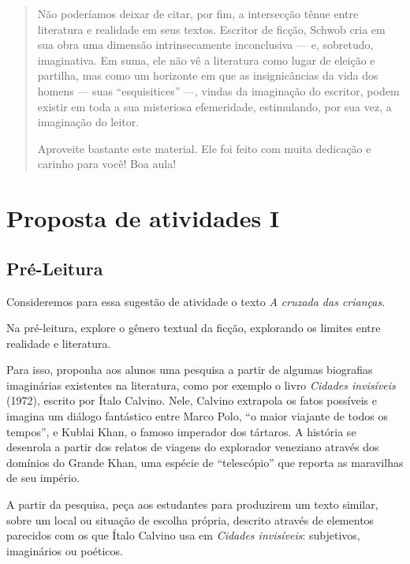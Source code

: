 \documentclass[12pt]{extarticle}
\begin{document}
\begin{abstract}
Não poderíamos deixar de citar, por fim, a intersecção tênue entre literatura 
e realidade em seus textos. Escritor de ficção, Schwob cria em sua obra uma 
dimensão intrinsecamente inconclusiva — e, sobretudo, imaginativa. Em suma, 
ele não vê a literatura como lugar de eleição e partilha, mas como um horizonte 
em que as insignicâncias da vida dos homens — suas ``esquisitices'' —, vindas 
da imaginação do escritor, podem existir em toda a sua misteriosa efemeridade, 
estimulando, por sua vez, a imaginação do leitor.

Aproveite bastante este material. Ele foi feito com muita dedicação e
carinho para você! Boa aula!


\end{abstract}


\tableofcontents



\section{Proposta de atividades I}

\subsection{Pré-Leitura}

Consideremos para essa sugestão de atividade o texto \textit{A cruzada das crianças}. 

Na pré-leitura, explore o gênero textual da ficção, explorando
os limites entre realidade e literatura.
 
Para isso, proponha aos alunos uma pesquisa a partir de algumas biografias
imaginárias existentes na literatura, como por exemplo o livro \emph{Cidades invisíveis} 
(1972), escrito por Ítalo Calvino. Nele, Calvino extrapola os fatos possíveis 
e imagina um diálogo fantástico entre Marco Polo, ``o maior viajante de todos os tempos'', 
e Kublai Khan, o famoso imperador dos tártaros. A história se desenrola a partir 
dos relatos de viagens do explorador veneziano através dos domínios do 
Grande Khan, uma espécie de ``telescópio'' que reporta as maravilhas de seu império.



A partir da pesquisa, peça aos estudantes para produzirem um texto similar, 
sobre um local ou situação de escolha própria, descrito 
através de elementos parecidos com os que Ítalo Calvino usa 
em \emph{Cidades invisíveis}: subjetivos, imaginários ou poéticos.
\end{document}
